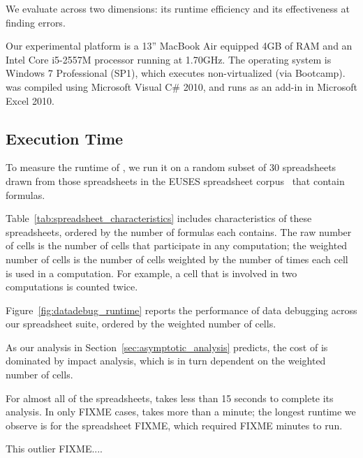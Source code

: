 We evaluate \checkcell{} across two dimensions: its runtime efficiency
and its effectiveness at finding errors.

Our experimental platform is a 13'' MacBook Air equipped 4GB of RAM
and an Intel Core i5-2557M processor running at 1.70GHz. The operating
system is Windows 7 Professional (SP1), which executes non-virtualized
(via Bootcamp). \checkcell{} was compiled using Microsoft Visual C\#
2010, and runs as an add-in in Microsoft Excel 2010.

\subsection{Execution Time}

To measure the runtime of \checkcell{}, we run it on a random subset
of 30 spreadsheets drawn from those spreadsheets in the EUSES
spreadsheet corpus~\cite{Fisher:2005:ESC:1082983.1083242} that contain
formulas.

Table~\ref{tab:spreadsheet_characteristics} includes
characteristics of these spreadsheets, ordered by the number of
formulas each contains. The raw number of cells is the number of cells
that participate in any computation; the weighted number of cells is
the number of cells weighted by the number of times each cell is used
in a computation. For example, a cell that is involved in two
computations is counted twice.

Figure~\ref{fig:datadebug_runtime} reports the performance of data
debugging across our spreadsheet suite, ordered by the weighted number
of cells.

As our analysis in Section~\ref{sec:asymptotic_analysis} predicts, the
cost of \checkcell{} is dominated by impact analysis, which is in turn
dependent on the weighted number of cells.

For almost all of the spreadsheets, \checkcell{} takes less than 15
seconds to complete its analysis. In only FIXME cases, \checkcell{}
takes more than a minute; the longest runtime we observe is for the
spreadsheet FIXME, which required FIXME minutes to run.

This outlier FIXME....

